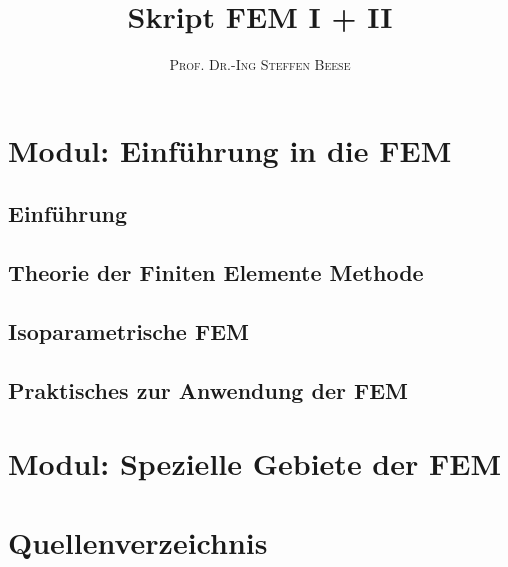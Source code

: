 \documentclass[a4paper,11pt,oneside]{book}
\title{\Huge \textbf{Skript FEM I + II}}
\author{\textsc{Prof. Dr.-Ing Steffen Beese}}
\begin{document}
\sloppy

\frontmatter
\maketitle

\tableofcontents

\mainmatter

% 
% 

\chapter{Modul: Einführung in die FEM}

\section{Einführung}











\section{Theorie der Finiten Elemente Methode}









\section{Isoparametrische FEM}









\section{Praktisches zur Anwendung der FEM}









\chapter{Modul: Spezielle Gebiete der FEM}



\chapter{Quellenverzeichnis}








\end{document}
